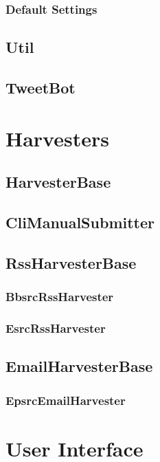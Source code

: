 \subsubsection{Default Settings}
\subsection{Util}
\subsection{TweetBot}
\section{Harvesters}
\subsection{HarvesterBase}
\subsection{CliManualSubmitter}
\subsection{RssHarvesterBase}
\subsubsection{BbsrcRssHarvester}
\subsubsection{EsrcRssHarvester}
\subsection{EmailHarvesterBase}
\subsubsection{EpsrcEmailHarvester}
\section{User Interface}

